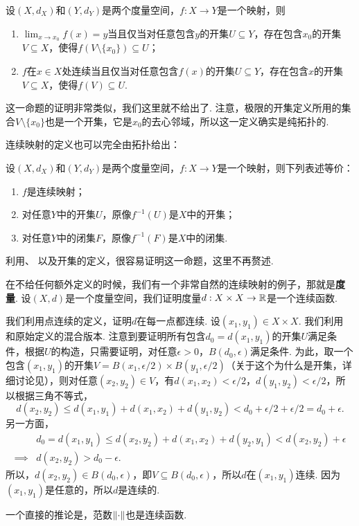 \begin{theorem}\label{theorem:continuous-open}
    设$(X,d_X)$和$(Y,d_Y)$是两个度量空间，$f:X\to Y$是一个映射，则
\begin{enumerate}
    \item $\lim_{x\to x_0} f(x)=y$当且仅当对任意包含$y$的开集$U\subseteq Y$，存在包含$x_0$的开集$V\subseteq X$，使得$f(V\setminus\{x_0\})\subseteq U$；
    \item  $f$在$x\in X$处连续当且仅当对任意包含$f(x)$的开集$U\subseteq Y$，存在包含$x$的开集$V\subseteq X$，使得$f(V)\subseteq U$.
\end{enumerate}
\end{theorem}

这一命题的证明非常类似，我们这里就不给出了. 注意，极限的开集定义所用的集合$V\setminus\{x_0\}$也是一个开集，它是$x_0$的去心邻域，所以这一定义确实是纯拓扑的. 

连续映射的定义也可以完全由拓扑给出：

\begin{theorem}\label{theorem:continuous-topology}
    设$(X,d_X)$和$(Y,d_Y)$是两个度量空间，$f:X\to Y$是一个映射，则下列表述等价：
    \begin{enumerate}
        \item $f$是连续映射；
        \item 对任意$Y$中的开集$U$，原像$f^{-1}(U)$是$X$中的开集；
        \item 对任意$Y$中的闭集$F$，原像$f^{-1}(F)$是$X$中的闭集. 
    \end{enumerate}
\end{theorem}

利用、 以及开集的定义，很容易证明这一命题，这里不再赘述. 

\begin{example}\label{example:metric-norm-continuous}
在不给任何额外定义的时候，我们有一个非常自然的连续映射的例子，那就是\textbf{度量}. 设$(X,d)$是一个度量空间，我们证明度量$d:X\times X\to\mathbb{R}$是一个连续函数. 

我们利用点连续的定义，证明$d$在每一点都连续. 设$(x_1,y_1)\in X\times X$. 我们利用 和原始定义的混合版本. 注意到要证明所有包含$d_0=d(x_1,y_1)$的开集$U$满足条件，根据$U$的构造，只需要证明，对任意$\epsilon>0$，$B(d_0,\epsilon)$满足条件. 为此，取一个包含$(x_1,y_1)$的开集$V=B(x_1,\epsilon/2)\times B(y_1,\epsilon/2)$（关于这个为什么是开集，详细讨论见），则对任意$(x_2,y_2)\in V$，有$d(x_1,x_2)<\epsilon/2$，$d(y_1,y_2)<\epsilon/2$，所以根据三角不等式，
\[d(x_2,y_2)\leq d(x_1,y_1)+d(x_1,x_2)+d(y_1,y_2)<d_0+\epsilon/2+\epsilon/2=d_0+\epsilon.\]
另一方面，
\begin{align*}
    &d_0=d(x_1,y_1)\leq d(x_2,y_2)+d(x_1,x_2)+d(y_2,y_1)<d(x_2,y_2)+\epsilon\\
\implies& d(x_2,y_2)>d_0-\epsilon.
\end{align*}
所以，$d(x_2,y_2)\in B(d_0,\epsilon)$，即$V\subseteq B(d_0,\epsilon)$，所以$d$在$(x_1,y_1)$连续. 因为$(x_1,y_1)$是任意的，所以$d$是连续的.

一个直接的推论是，范数$\left\|\cdot\right\|$也是连续函数. 
\end{example}

